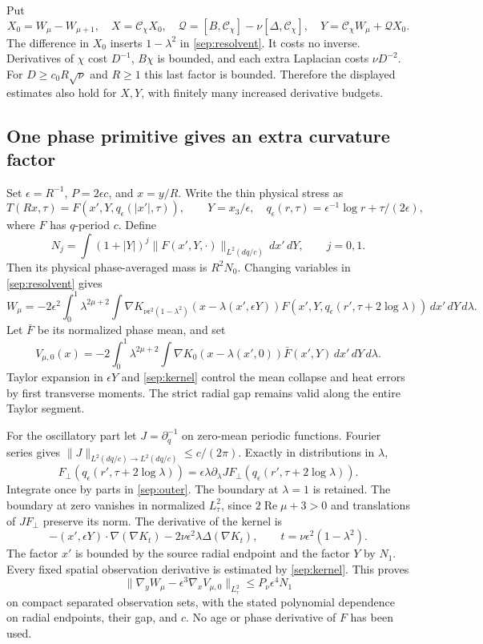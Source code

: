 Put
\[
 X_0=W_\mu-W_{\mu+1},\quad X=\mathcal C_\chi X_0,
 \quad \mathcal Q=[B,\mathcal C_\chi]-\nu[\Delta,\mathcal C_\chi],
 \quad Y=\mathcal C_\chi W_\mu+\mathcal QX_0.
\]
The difference in $X_0$ inserts $1-\lambda^2$ in
\eqref{sep:resolvent}. It costs no inverse. Derivatives of $\chi$
cost $D^{-1}$, $B\chi$ is bounded, and each extra Laplacian costs
$\nu D^{-2}$. For $D\ge c_0R\sqrt\nu$ and $R\ge1$ this last
factor is bounded. Therefore the displayed estimates also hold for
$X,Y$, with finitely many increased derivative budgets.

\subsection{One phase primitive gives an extra curvature factor}

Set $\epsilon=R^{-1}$, $P=2\epsilon c$, and $x=y/R$.
Write the thin physical stress as
\[
 T(Rx,\tau)=F(x',Y,q_\epsilon(|x'|,\tau)),\qquad
 Y=x_3/\epsilon,\quad
 q_\epsilon(r,\tau)=\epsilon^{-1}\log r+\tau/(2\epsilon),
\]
where $F$ has $q$-period $c$. Define
\[
 N_j=\int(1+|Y|)^j
       \|F(x',Y,\cdot)\|_{L^2(dq/c)}\,dx'\,dY,
       \qquad j=0,1.
\]
Then its physical phase-averaged mass is $R^2N_0$.
Changing variables in \eqref{sep:resolvent} gives
\begin{equation}\label{sep:outer}
 W_\mu=-2\epsilon^2\int_0^1\lambda^{2\mu+2}
  \int\nabla K_{\nu\epsilon^2(1-\lambda^2)}
       (x-\lambda(x',\epsilon Y))
 F(x',Y,q_\epsilon(r',\tau+2\log\lambda))\,dx'\,dY\,d\lambda.
\end{equation}
Let $\bar F$ be its normalized phase mean, and set
\[
 V_{\mu,0}(x)=-2\int_0^1\lambda^{2\mu+2}
  \int\nabla K_0(x-\lambda(x',0))\bar F(x',Y)
                                  \,dx'\,dY\,d\lambda.
\]
Taylor expansion in $\epsilon Y$ and \eqref{sep:kernel} control
the mean collapse and heat errors by first transverse moments. The
strict radial gap remains valid along the entire Taylor segment.

For the oscillatory part let $J=\partial_q^{-1}$ on zero-mean
periodic functions. Fourier series gives
$\|J\|_{L^2(dq/c)\to L^2(dq/c)}\le c/(2\pi)$. Exactly in
distributions in $\lambda$,
\[
 F_\perp(q_\epsilon(r',\tau+2\log\lambda))
 =\epsilon\lambda\partial_\lambda
   JF_\perp(q_\epsilon(r',\tau+2\log\lambda)).
\]
Integrate once by parts in \eqref{sep:outer}. The boundary at
$\lambda=1$ is retained. The boundary at zero vanishes in normalized
$L^2_\tau$, since $2\operatorname{Re}\mu+3>0$ and translations of
$JF_\perp$ preserve its norm. The derivative of the kernel is
\[
 -(x',\epsilon Y)\cdot\nabla(\nabla K_t)
       -2\nu\epsilon^2\lambda\Delta(\nabla K_t),
       \qquad t=\nu\epsilon^2(1-\lambda^2).
\]
The factor $x'$ is bounded by the source radial endpoint and the
factor $Y$ by $N_1$. Every fixed spatial observation derivative is
estimated by \eqref{sep:kernel}. This proves
\begin{equation}\label{sep:mean-comparison}
 \|\nabla_yW_\mu-\epsilon^3\nabla_xV_{\mu,0}\|_{L^2_\tau}
       \le P_\nu\epsilon^4N_1
\end{equation}
on compact separated observation sets, with the stated polynomial
dependence on radial endpoints, their gap, and $c$.
No age or phase derivative of $F$ has been used.

